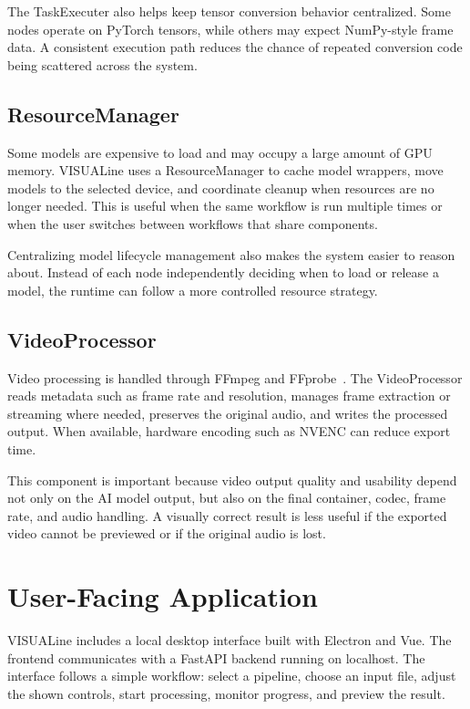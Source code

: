 \documentclass[11pt,a4paper]{article}
\begin{document}
The TaskExecuter also helps keep tensor conversion behavior centralized. Some nodes operate on PyTorch tensors, while others may expect NumPy-style frame data. A consistent execution path reduces the chance of repeated conversion code being scattered across the system.

\subsection{ResourceManager}

Some models are expensive to load and may occupy a large amount of GPU memory. VISUALine uses a ResourceManager to cache model wrappers, move models to the selected device, and coordinate cleanup when resources are no longer needed. This is useful when the same workflow is run multiple times or when the user switches between workflows that share components.

Centralizing model lifecycle management also makes the system easier to reason about. Instead of each node independently deciding when to load or release a model, the runtime can follow a more controlled resource strategy.

\subsection{VideoProcessor}

Video processing is handled through FFmpeg and FFprobe~\cite{ffmpeg}. The VideoProcessor reads metadata such as frame rate and resolution, manages frame extraction or streaming where needed, preserves the original audio, and writes the processed output. When available, hardware encoding such as NVENC can reduce export time.

This component is important because video output quality and usability depend not only on the AI model output, but also on the final container, codec, frame rate, and audio handling. A visually correct result is less useful if the exported video cannot be previewed or if the original audio is lost.

\section{User-Facing Application}

VISUALine includes a local desktop interface built with Electron and Vue. The frontend communicates with a FastAPI backend running on localhost. The interface follows a simple workflow: select a pipeline, choose an input file, adjust the shown controls, start processing, monitor progress, and preview the result.
\end{document}
